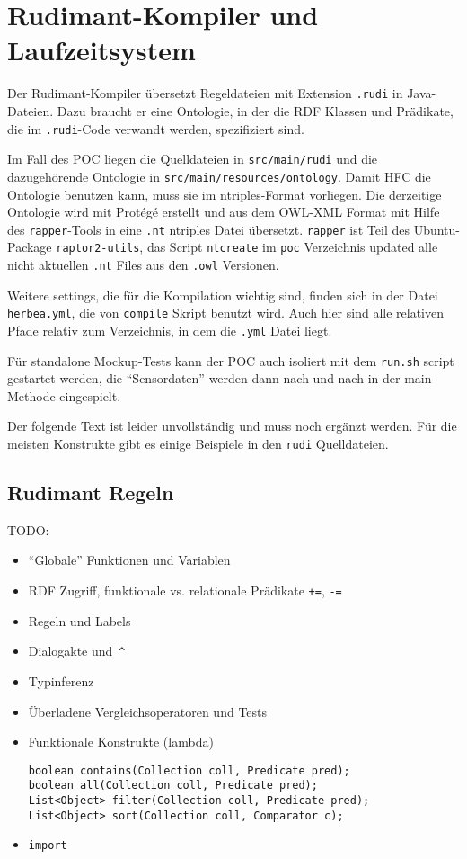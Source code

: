 \section{Rudimant-Kompiler und Laufzeitsystem}

Der Rudimant-Kompiler übersetzt Regeldateien mit Extension \texttt{.rudi} in
Java-Dateien. Dazu braucht er eine Ontologie, in der die RDF Klassen und
Prädikate, die im \texttt{.rudi}-Code verwandt werden, spezifiziert sind.

Im Fall des POC liegen die Quelldateien in \texttt{src/main/rudi} und die
dazugehörende Ontologie in \texttt{src/main/resources/ontology}. Damit HFC
die Ontologie benutzen kann, muss sie im ntriples-Format vorliegen. Die
derzeitige Ontologie wird mit Protégé erstellt und aus dem OWL-XML Format
mit Hilfe des \texttt{rapper}-Tools in eine \texttt{.nt} ntriples Datei
übersetzt. \texttt{rapper} ist Teil des Ubuntu-Package \texttt{raptor2-utils},
das Script \texttt{ntcreate} im \texttt{poc} Verzeichnis updated alle nicht
aktuellen \texttt{.nt} Files aus den \texttt{.owl} Versionen.

Weitere settings, die für die Kompilation wichtig sind, finden sich in der
Datei \texttt{herbea.yml}, die von \texttt{compile} Skript benutzt wird. Auch
hier sind alle relativen Pfade relativ zum Verzeichnis, in dem die
\texttt{.yml} Datei liegt.

Für standalone Mockup-Tests kann der POC auch isoliert mit dem \texttt{run.sh}
script gestartet werden, die ``Sensordaten'' werden dann nach und nach in
der main-Methode eingespielt.

Der folgende Text ist leider unvollständig und muss noch ergänzt werden. Für
die meisten Konstrukte gibt es einige Beispiele in den \texttt{rudi}
Quelldateien.

\subsection{Rudimant Regeln}

TODO:
\begin{itemize}
\item ``Globale'' Funktionen und Variablen
\item RDF Zugriff, funktionale vs. relationale Prädikate
  \texttt{+=}, \texttt{-=}
\item Regeln und Labels
\item Dialogakte und\ {\Large\verb|^|}
\item Typinferenz
\item Überladene Vergleichsoperatoren und Tests
\item Funktionale Konstrukte (lambda)
\begin{verbatim}
boolean contains(Collection coll, Predicate pred);
boolean all(Collection coll, Predicate pred);
List<Object> filter(Collection coll, Predicate pred);
List<Object> sort(Collection coll, Comparator c);
\end{verbatim}
\item \texttt{import}
\end{itemize}

